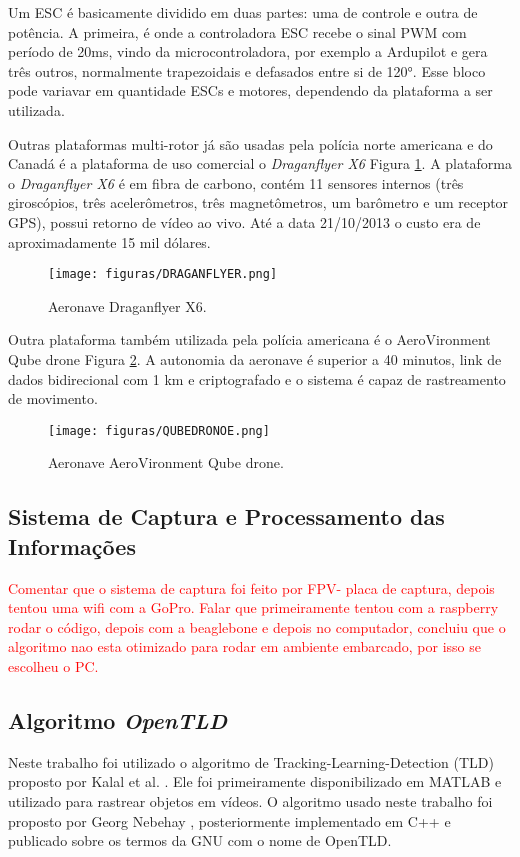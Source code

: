 Um ESC é basicamente dividido em duas partes: uma de controle e outra de potência. A primeira, é onde a controladora ESC recebe o sinal PWM com período de 20ms, vindo da microcontroladora, por exemplo a Ardupilot e gera três outros, normalmente trapezoidais e defasados entre si de \ang{120}. Esse bloco pode variavar em quantidade ESCs e motores, dependendo da plataforma a ser utilizada. 

Outras plataformas multi-rotor já são usadas pela polícia norte americana e do Canadá é a plataforma de uso comercial o \textit{Draganflyer X6} Figura \ref{DRAGANFLYER}. A plataforma o \textit{Draganflyer X6} é em fibra de carbono, contém 11 sensores internos (três giroscópios, três acelerômetros, três magnetômetros, um barômetro e um receptor GPS), possui retorno de vídeo ao vivo. Até a data 21/10/2013 o custo era de aproximadamente 15 mil dólares.

\begin{figure}
	\centering
	\texttt{[image: figuras/DRAGANFLYER.png]}
    \caption{Aeronave Draganflyer X6.}
    \label{DRAGANFLYER}
\end{figure}

Outra plataforma também utilizada pela polícia americana é o AeroVironment Qube drone Figura \ref{QUBEDRONOE}.  A autonomia da aeronave é superior a 40 minutos, link de dados bidirecional com 1 km e criptografado e o sistema é capaz de rastreamento de movimento. 

\begin{figure}
	\centering
	\texttt{[image: figuras/QUBEDRONOE.png]}
    \caption{Aeronave AeroVironment Qube drone.}
    \label{QUBEDRONOE}
\end{figure}

\subsection{Sistema de Captura e Processamento das Informações}
\textcolor{red}{Comentar que o sistema de captura foi feito por FPV- placa de captura, depois tentou uma wifi com a GoPro.
Falar que primeiramente tentou com a raspberry rodar o código, depois com a beaglebone e depois no computador, concluiu que o algoritmo nao esta otimizado para rodar em ambiente embarcado, por isso se escolheu o PC.}

\subsection{Algoritmo \textit{OpenTLD}}
Neste trabalho foi utilizado o algoritmo de Tracking-Learning-Detection (TLD) proposto por Kalal et al. \cite{KalalMikolajczykMatas}. Ele foi primeiramente disponibilizado em MATLAB e utilizado para rastrear objetos em vídeos. O algoritmo usado neste trabalho foi proposto por Georg Nebehay \cite{NebehayGeorg}, posteriormente implementado em C++ e publicado sobre os termos da GNU com o nome de OpenTLD.

